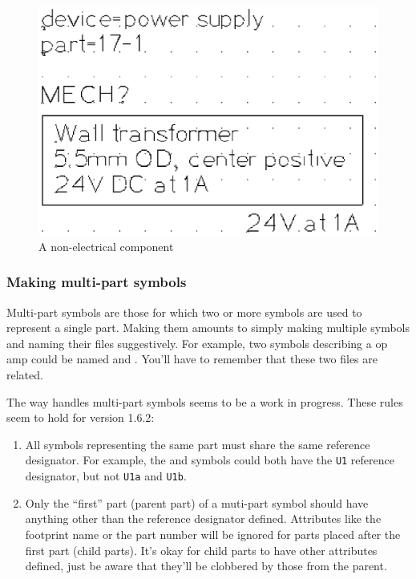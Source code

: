 \begin{figure}[ht]
  \begin{center}
    \includegraphics[clip,scale=0.4]{wall_xformer_24v_1a.ps}
    \caption{A non-electrical component\label{non_electric}}
  \end{center}
\end{figure}


\clearpage
\subsubsection{Making multi-part symbols}
Multi-part symbols are those for which two or more symbols are used to
represent a single part.  Making them amounts to simply making
multiple symbols and naming their files suggestively.  For example,
two symbols describing a  op amp could be named
 and .  You'll have to remember that
these two files are related.

The way  handles multi-part symbols seems to be a
work in progress.  These rules seem to hold for 
version 1.6.2:
\begin{enumerate}
\item All symbols representing the same part must share the same
  reference designator.  For example, the  and
   symbols could both have the \texttt{U1} reference
  designator, but not \texttt{U1a} and \texttt{U1b}.
\item Only the ``first'' part (parent part) of a muti-part symbol
  should have anything other than the reference designator defined.
  Attributes like the footprint name or the part number will be
  ignored for parts placed after the first part (child parts).  It's
  okay for child parts to have other attributes defined, just be aware
  that they'll be clobbered by those from the parent.
\end{enumerate}

